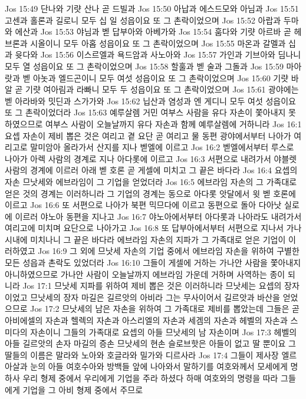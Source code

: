 Jos 15:49  단나와 기럇 산나 곧 드빌과
Jos 15:50  아납과 에스드모와 아님과
Jos 15:51  고센과 홀론과 길로니 모두 십 일 성읍이요 또 그 촌락이었으며
Jos 15:52  아랍과 두마와 에산과
Jos 15:53  야님과 벧 답부아와 아베가와
Jos 15:54  훔다와 기럇 아르바 곧 헤브론과 시올이니 모두 아홉 성읍이요 또 그 촌락이었으며
Jos 15:55  마온과 갈멜과 십과 윳다와
Jos 15:56  이스르엘과 욕드암과 사노아와
Jos 15:57  가인과 기브아와 딤나니 모두 열 성읍이요 또 그 촌락이었으며
Jos 15:58  할훌과 벧 술과 그돌과
Jos 15:59  마아랏과 벧 아놋과 엘드곤이니 모두 여섯 성읍이요 또 그 촌락이었으며
Jos 15:60  기럇 바알 곧 기럇 여아림과 라빠니 모두 두 성읍이요 또 그 촌락이었으며
Jos 15:61  광야에는 벧 아라바와 밋딘과 스가가와
Jos 15:62  닙산과 염성과 엔 게디니 모두 여섯 성읍이요 또 그 촌락이었더라
Jos 15:63  예루살렘 거민 여부스 사람을 유다 자손이 쫓아내지 못하였으므로 여부스 사람이 오늘날까지 유다 자손과 함께 예루살렘에 거하니라
Jos 16:1  요셉 자손이 제비 뽑은 것은 여리고 곁 요단 곧 여리고 물 동편 광야에서부터 나아가 여리고로 말미암아 올라가서 산지를 지나 벧엘에 이르고
Jos 16:2  벧엘에서부터 루스로 나아가 아렉 사람의 경계로 지나 아다롯에 이르고
Jos 16:3  서편으로 내려가서 야블렛 사람의 경계에 이르러 아래 벧 호론 곧 게셀에 미치고 그 끝은 바다라
Jos 16:4  요셉의 자손 므낫세와 에브라임이 그 기업을 얻었더라
Jos 16:5  에브라임 자손의 그 가족대로 얻은 것의 경계는 이러하니라 그 기업의 경계는 동으로 아다롯 앗달에서 윗 벧 호론에 이르고
Jos 16:6  또 서편으로 나아가 북편 믹므다에 이르고 동편으로 돌아 다아낫 실로에 이르러 야노아 동편을 지나고
Jos 16:7  야노아에서부터 아다롯과 나아라도 내려가서 여리고에 미치며 요단으로 나아가고
Jos 16:8  또 답부아에서부터 서편으로 지나서 가나 시내에 미치나니 그 끝은 바다라 에브라임 자손의 지파가 그 가족대로 얻은 기업이 이러하였고
Jos 16:9  그 외에 므낫세 자손의 기업 중에서 에브라임 자손을 위하여 구별한 모든 성읍과 촌락도 있었더라
Jos 16:10  그들이 게셀에 거하는 가나안 사람을 쫓아내지 아니하였으므로 가나안 사람이 오늘날까지 에브라임 가운데 거하며 사역하는 종이 되니라
Jos 17:1  므낫세 지파를 위하여 제비 뽑은 것은 이러하니라 므낫세는 요셉의 장자이었고 므낫세의 장자 마길은 길르앗의 아비라 그는 무사이어서 길르앗과 바산을 얻었으므로
Jos 17:2  므낫세의 남은 자손을 위하여 그 가족대로 제비를 뽑았는데 그들은 곧 아비에셀의 자손과 헬렉의 자손과 아스리엘의 자손과 세겜의 자손과 헤벨의 자손과 스미다의 자손이니 그들의 가족대로 요셉의 아들 므낫세의 남 자손이며
Jos 17:3  헤벨의 아들 길르앗의 손자 마길의 증손 므낫세의 현손 슬로브핫은 아들이 없고 딸 뿐이요 그 딸들의 이름은 말라와 노아와 호글라와 밀가와 디르사라
Jos 17:4  그들이 제사장 엘르아살과 눈의 아들 여호수아와 방백들 앞에 나아와서 말하기를 여호와께서 모세에게 명하사 우리 형제 중에서 우리에게 기업을 주라 하셨다 하매 여호와의 명령을 따라 그들에게 기업을 그 아비 형제 중에서 주므로
